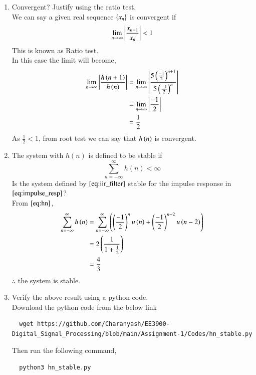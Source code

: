 \documentclass[journal,12pt,twocolumn]{IEEEtran}
\renewcommand\thesection{\arabic{section}}
\begin{document}
\begin{enumerate}[label=\thesection.\arabic*]
     \item Convergent? Justify using the ratio test.\\
     \solution We can say a given real sequence $\left\{x_n\right\}$ is convergent if 
       \begin{align}
         \lim_{n \rightarrow \infty}\left\vert\frac{x_{n+1}}{x_n}\right\vert < 1
       \end{align}
        This is known as Ratio test.\\
      In this case the limit will become,
       \begin{align}
         \lim_{n \rightarrow \infty}\left\vert\frac{h\left(n+1\right)}{h\left(n\right)}\right\vert &= \lim_{n \rightarrow \infty}\left\vert\frac{5\left(\frac{-1}{2}\right)^{n+1}}{5\left(\frac{-1}{2}\right)^{n}}\right\vert \\
          &= \lim_{n \rightarrow \infty}\left\vert\frac{-1}{2}\right\vert\\
          &= \frac{1}{2}
       \end{align}
      As $\frac{1}{2} < 1$, from root test we can say that $h\left(n\right)$ is convergent.
       \item The system with $h(n)$ is defined to be stable if
     \begin{equation}
      \sum_{n=-\infty}^{\infty}h(n) < \infty
     \end{equation}
        Is the system defined by $\eqref{eq:iir_filter}$ stable for the impulse response in $\eqref{eq:impulse_resp}$?\\
    \solution From $\eqref{eq:hn}$,
      \begin{align}
        \sum_{n=-\infty}^{\infty}h\left(n\right) &= \sum_{n=-\infty}^{\infty}\left(\left(\frac{-1}{2}\right)^{n} u\left(n\right) + \left(\frac{-1}{2}\right)^{n-2} u\left(n-2\right)\right)\\
                                           &= 2\left(\frac{1}{1+\frac{1}{2}}\right)\\
                                           &= \frac{4}{3}
      \end{align}
       $\therefore$ the system is stable.  
    \item Verify the above result using a python code.\\
    \solution Download the python code from the below link 
    \begin{lstlisting}
  wget https://github.com/Charanyash/EE3900-Digital_Signal_Processing/blob/main/Assignment-1/Codes/hn_stable.py
    \end{lstlisting}
  Then run the following command,
    \begin{lstlisting}
  python3 hn_stable.py

\end{lstlisting}
\end{enumerate}
\end{document}
